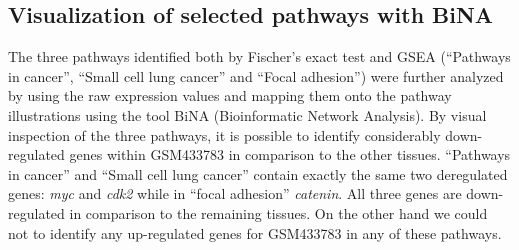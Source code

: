 \subsection{Visualization of selected pathways with BiNA}

The three pathways identified both by Fischer's exact test and GSEA (``Pathways
in cancer'', ``Small cell lung cancer'' and ``Focal adhesion'') were further
analyzed by using the raw expression values and mapping them onto the pathway
illustrations using the tool BiNA (Bioinformatic Network Analysis). By visual
inspection of the three pathways, it is possible to identify considerably
down-regulated genes within GSM433783 in comparison to the other tissues.
``Pathways in cancer'' and ``Small cell lung cancer'' contain exactly the same
two deregulated genes: \textit{myc} and \textit{cdk2} while in ``focal
adhesion'' \textit{catenin}. All three genes are down-regulated in comparison to
the remaining tissues. On the other hand we could not to identify any
up-regulated genes for GSM433783 in any of these pathways.

